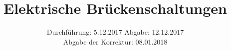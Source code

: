 

\subject{Versuch 302}
\title{Elektrische Brückenschaltungen}
\date{
  Durchführung: 5.12.2017
  \hspace{3em}
  Abgabe: 12.12.2017 \\
  Abgabe der Korrektur: 08.01.2018
}



\maketitle
\thispagestyle{empty}
\tableofcontents
\newpage




\newpage


\newpage
\printbibliography{}




